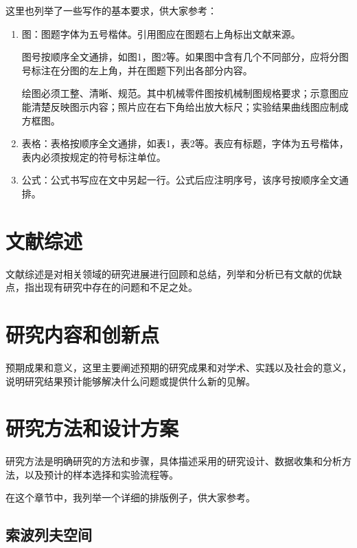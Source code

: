 \documentclass{suesreport}
\begin{document}
    这里也列举了一些写作的基本要求，供大家参考：
    \begin{enumerate}[label=\arabic*. ]
    \item 图：图题字体为五号楷体。引用图应在图题右上角标出文献来源。
    
    图号按顺序全文通排，如图1，图2等。如果图中含有几个不同部分，应将分图号标注在分图的左上角，并在图题下列出各部分内容。
    
    绘图必须工整、清晰、规范。其中机械零件图按机械制图规格要求；示意图应能清楚反映图示内容；照片应在右下角给出放大标尺；实验结果曲线图应制成方框图。
    \item 表格：表格按顺序全文通排，如表1，表2等。表应有标题，字体为五号楷体，表内必须按规定的符号标注单位。
    \item 公式：公式书写应在文中另起一行。公式后应注明序号，该序号按顺序全文通排。
    \end{enumerate}
    \section{文献综述}
    文献综述是对相关领域的研究进展进行回顾和总结，列举和分析已有文献的优缺点，指出现有研究中存在的问题和不足之处。
    \section{研究内容和创新点}
    预期成果和意义，这里主要阐述预期的研究成果和对学术、实践以及社会的意义，说明研究结果预计能够解决什么问题或提供什么新的见解。
    \section{研究方法和设计方案}
    研究方法是明确研究的方法和步骤，具体描述采用的研究设计、数据收集和分析方法，以及预计的样本选择和实验流程等。

    在这个章节中，我列举一个详细的排版例子，供大家参考。
    \subsection{索波列夫空间}
\end{document}
